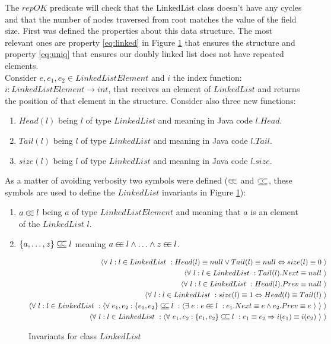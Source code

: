 \begin{code}
The $repOK$ predicate will check that the LinkedList class doesn't have any cycles and that the number of nodes traversed from root matches the value of the field size.
First was defined the properties about this data structure. The most relevant ones are property \ref{eq:linked} in Figure \ref{fig:formulae} that
ensures the structure and property \ref{eq:uniq} that ensures our doubly linked list does not have repeated elements.\\
Consider $e,e_1,e_2 \in LinkedListElement$ and $i$ the index function: $i : LinkedListElement \rightarrow int$, that receives an element of $LinkedList$ and
returns the position of that element in the structure. Consider also three new functions:
\begin{enumerate}
\item $Head(l)$ being $l$ of type $LinkedList$ and meaning in Java code $l.Head$.
\item $Tail(l)$ being $l$ of type $LinkedList$ and meaning in Java code $l.Tail$.
\item $size(l)$ being $l$ of type $LinkedList$ and meaning in Java code $l.size$.
\end{enumerate}

As a matter of avoiding verbosity two symbols were defined ($\mathbin{\in\mkern-4mu\in}$ and $\mathbin{\subseteq\mkern-4mu\subseteq}$, these symbols are used to define the $LinkedList$ invariants in Figure \ref{fig:formulae}):
\begin{enumerate}
\item $a \mathbin{\in\mkern-4mu\in} l$ being $a$ of type $LinkedListElement$ and meaning that $a$ is an element of the $LinkedList$ $l$.
\item $\{a,\ldots,z\} \mathbin{\subseteq\mkern-4mu\subseteq} l$ meaning $a \mathbin{\in\mkern-4mu\in} l \wedge \ldots \wedge z \mathbin{\in\mkern-4mu\in} l$.
\end{enumerate}

\begin{figure}[!Hb]
\begin{eqnarray}
\langle\forall \ l : l \in LinkedList \ : Head(l) \equiv null \vee Tail(l) \equiv null \Leftrightarrow size(l) \equiv 0 \ \rangle\\
\langle\forall \ l : l \in LinkedList \ : Tail(l).Next \equiv null \ \rangle\\
\langle\forall \ l : l \in LinkedList \ : Head(l).Prev \equiv null \ \rangle\\
\langle\forall \ l : l \in LinkedList \ : size(l) \equiv 1 \Leftrightarrow Head(l) \equiv Tail(l) \ \rangle\\
\langle\forall \ l : l \in LinkedList \ : \langle\forall \ e_1,e_2 : \{e_1,e_2\} \mathbin{\subseteq\mkern-4mu\subseteq} l \ : \langle\exists \ e : e \mathbin{\in\mkern-4mu\in} l \ : e_1.Next \equiv e \wedge e_2.Prev \equiv e \ \rangle \ \rangle\label{eq:linked} \ \rangle\\
\langle\forall \ l : l \in LinkedList \ : \langle\forall \ e_1,e_2 : \{e_1,e_2\} \mathbin{\subseteq\mkern-4mu\subseteq} l \ : e_1 \equiv e_2 \Rightarrow i(e_1) \equiv i(e_2) \ \rangle\label{eq:uniq} \ \rangle
\end{eqnarray}
\caption{Invariants for class $LinkedList$}
\label{fig:formulae}
\end{figure}


\end{code}
